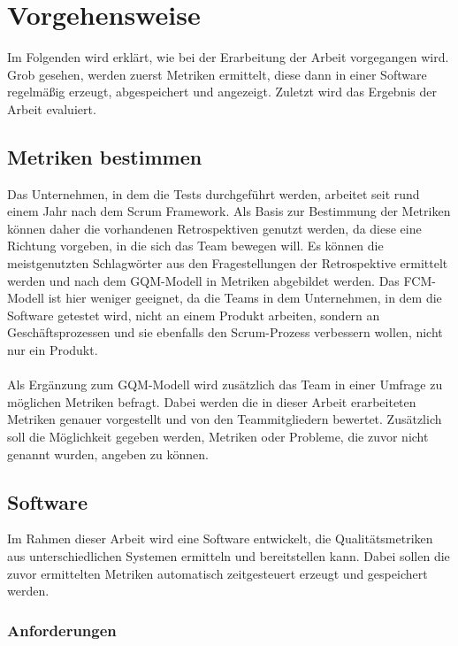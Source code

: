 \chapter{Vorgehensweise}

Im Folgenden wird erklärt, wie bei der Erarbeitung der Arbeit vorgegangen wird.
Grob gesehen, werden zuerst Metriken ermittelt, diese dann in einer Software regelmäßig erzeugt, abgespeichert und angezeigt.
Zuletzt wird das Ergebnis der Arbeit evaluiert.

\section{Metriken bestimmen}

Das Unternehmen, in dem die Tests durchgeführt werden, arbeitet seit rund einem Jahr nach dem Scrum Framework.
Als Basis zur Bestimmung der Metriken können daher die vorhandenen Retrospektiven genutzt werden, da diese eine Richtung vorgeben, in die sich das Team bewegen will.
Es können die meistgenutzten Schlagwörter aus den Fragestellungen der Retrospektive ermittelt werden und nach dem \ac{GQM}-Modell in Metriken abgebildet werden.
Das \ac{FCM}-Modell ist hier weniger geeignet, da die Teams in dem Unternehmen, in dem die Software getestet wird, nicht an einem Produkt arbeiten, sondern an Geschäftsprozessen und sie ebenfalls den Scrum-Prozess verbessern wollen, nicht nur ein Produkt.
\\
\\
Als Ergänzung zum \ac{GQM}-Modell wird zusätzlich das Team in einer Umfrage zu möglichen Metriken befragt.
Dabei werden die in dieser Arbeit erarbeiteten Metriken genauer vorgestellt und von den Teammitgliedern bewertet.
Zusätzlich soll die Möglichkeit gegeben werden, Metriken oder Probleme, die zuvor nicht genannt wurden, angeben zu können.

\clearpage
\section{Software}

Im Rahmen dieser Arbeit wird eine Software entwickelt, die Qualitätsmetriken aus unterschiedlichen Systemen ermitteln und bereitstellen kann.
Dabei sollen die zuvor ermittelten Metriken automatisch zeitgesteuert erzeugt und gespeichert werden.

\subsection{Anforderungen}\label{vorgehen:software}

